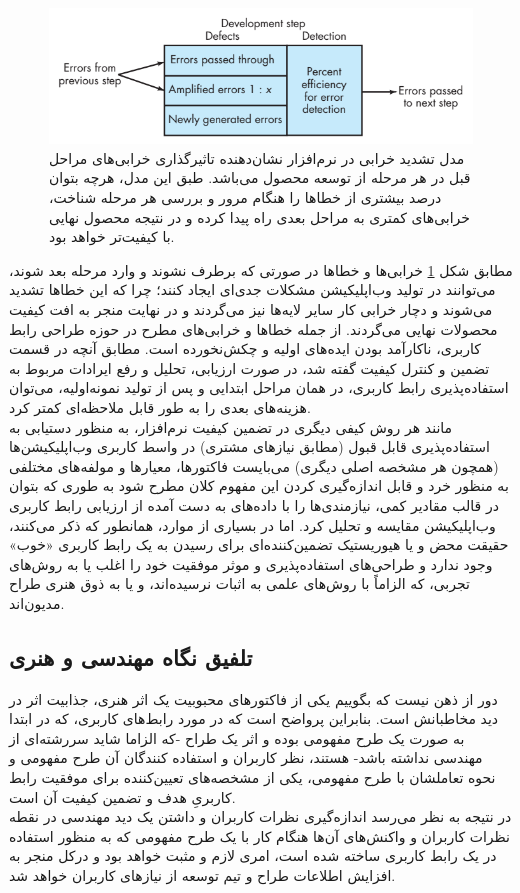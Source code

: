 \begin{figure}[H]
	\centering\includegraphics[width=12cm]{Resources/defect.PNG}
	\caption[مدل تشدید خرابی در نرم‌افزار]
	{مدل تشدید خرابی در نرم‌افزار
		\cite{pressman_software_2015}
		نشان‌دهنده تاثیرگذاری خرابی‌های مراحل قبل در هر مرحله از توسعه محصول می‌باشد. طبق این مدل، هرچه بتوان درصد بیشتری از خطاها را هنگام مرور و بررسی هر مرحله شناخت، خرابی‌های کمتری به مراحل بعدی راه پیدا کرده و در نتیجه محصول نهایی با کیفیت‌تر خواهد بود.
	}
	\label{fig:defect}
\end{figure}
مطابق شکل
\ref{fig:defect}
خرابی‌ها و خطاها در صورتی که برطرف نشوند و وارد مرحله بعد شوند، می‌توانند در تولید وب‌اپلیکیشن مشکلات جدی‌ای ایجاد کنند؛ چرا که این خطاها تشدید می‌شوند و دچار خرابی کار سایر لایه‌ها نیز می‌گردند و در نهایت منجر به افت کیفیت محصولات نهایی می‌گردند. از جمله خطاها و خرابی‌های مطرح در حوزه طراحی رابط کاربری، ناکارآمد بودن ایده‌های اولیه و چکش‌نخورده است. مطابق آنچه در قسمت تضمین و کنترل کیفیت گفته شد، در صورت ارزیابی، تحلیل و رفع ایرادات مربوط به استفاده‌پذیری رابط کاربری، در همان مراحل ابتدایی و پس از تولید نمونه‌اولیه، می‌توان هزینه‌های بعدی را به طور قابل ملاحظه‌ای کمتر کرد.\\
مانند هر روش کیفی دیگری در تضمین کیفیت نرم‌افزار، به منظور دستیابی به استفاده‌پذیری قابل قبول (مطابق نیازهای مشتری) در واسط کاربری وب‌اپلیکیشن‌ها (همچون هر مشخصه اصلی دیگری) می‌بایست فاکتورها، معیارها و مولفه‌های مختلفی به منظور خرد و قابل اندازه‌گیری کردن این مفهوم کلان مطرح شود به طوری که بتوان در قالب مقادیر کمی، نیازمندی‌ها را با داده‌های به دست آمده از ارزیابی رابط کاربری وب‌اپلیکیشن مقایسه و تحلیل کرد. اما در بسیاری از موارد، همانطور که
\cite{agarwal_assessing_2002,p._miguel_review_2014, albert_measuring_2013}
ذکر می‌کنند، حقیقت محض و یا هیوریستیک تضمین‌کننده‌ای برای رسیدن به یک رابط کاربری «خوب» وجود ندارد و طراحی‌های استفاده‌پذیری و موثر موفقیت خود را اغلب یا به روش‌های تجربی، که الزاماً با روش‌های علمی به اثبات نرسیده‌اند، و یا به ذوق هنری طراح مدیون‌اند.
\subsection{تلفیق نگاه مهندسی و هنری}
دور از ذهن نیست که بگوییم یکی از فاکتورهای محبوبیت یک اثر هنری، جذابیت اثر در دید مخاطبانش است. بنابراین پرواضح است که در مورد رابط‌های کاربری، که در ابتدا به صورت یک طرح مفهومی بوده و اثر یک طراح -که الزاما شاید سررشته‌ای از مهندسی نداشته باشد- هستند، نظر کاربران و استفاده کنندگان آن طرح مفهومی و نحوه تعاملشان با طرح مفهومی، یکی از مشخصه‌های تعیین‌کننده برای موفقیت رابط کاربریِ هدف و تضمین کیفیت آن است.\\
در نتیجه به نظر می‌رسد اندازه‌گیری نظرات کاربران و داشتن یک دید مهندسی در نقطه نظرات کاربران و واکنش‌های آن‌ها هنگام کار با یک طرح مفهومی که به منظور استفاده در یک رابط کاربری ساخته شده است، امری لازم و مثبت خواهد بود و درکل منجر به افزایش اطلاعات طراح و تیم توسعه از نیازهای کاربران خواهد شد.

